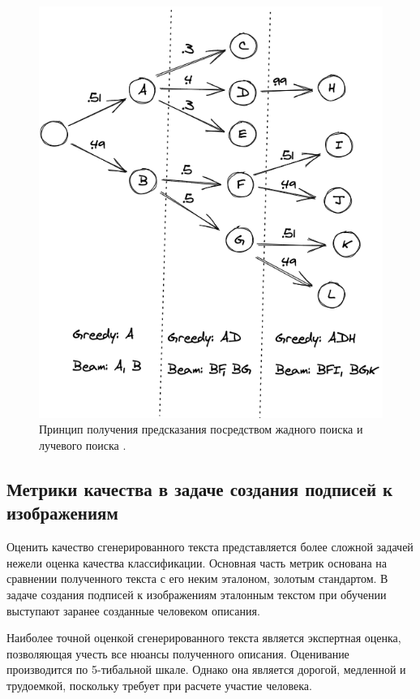 \documentclass[a4paper,12pt]{extarticle}
\begin{document}
\begin{figure}[ht]
	\centering
	\includegraphics[scale=0.4]{beamsearch_vs_greedsearch.png}
	\caption{Принцип получения предсказания посредством жадного поиска и лучевого поиска  \cite{vitalflux}.}
	\label{fig:beamsearch_vs_greedsearch}
\end{figure}

\subsection{Метрики качества в задаче создания подписей к изображениям}

Оценить качество сгенерированного текста представляется более сложной задачей нежели оценка качества классификации. Основная часть метрик основана на сравнении полученного текста с его неким эталоном, золотым стандартом. В задаче создания подписей к изображениям эталонным текстом при обучении выступают заранее созданные человеком описания.

Наиболее точной оценкой сгенерированного текста является экспертная оценка, позволяющая учесть все нюансы полученного описания. Оценивание производится по 5-тибальной шкале. Однако она является дорогой, медленной и трудоемкой, поскольку требует при расчете участие человека.
\end{document}
